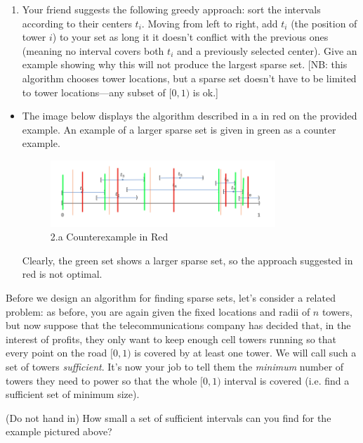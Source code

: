 \documentclass[letterpaper,11pt]{article}
\begin{document}
\begin{enumerate}
\begin{enumerate}
    \item Your friend suggests the following greedy approach: sort the intervals according to their centers $t_i$. Moving from left to right, add $t_i$ (the position of tower $i$) to your set as long it it doesn't conflict with the previous ones (meaning no interval covers both $t_i$ and a previously selected center). Give an example showing why this will not produce the largest sparse set. [NB: this algorithm chooses tower locations, but a sparse set doesn't have to be limited to tower locations—any subset of $[0,1)$ is ok.]
\end{enumerate}

\begin{itemize}
    \color{teal}
    \item The image below displays the algorithm described in a in red on the 
        provided example. An example of a larger sparse set is given in green 
        as a counter example.
        \begin{figure}[htpb]
            \centering
            \includegraphics[width=0.8\textwidth]{2a}
            \caption{2.a Counterexample in Red}
            \label{fig:2a}
        \end{figure}

        Clearly, the green set shows a larger sparse set, so the approach
        suggested in red is not optimal.
\end{itemize}


Before we design an algorithm for finding sparse sets, let's consider a related problem: as before, you are again given the fixed locations and radii of $n$ towers, but now suppose that the telecommunications company has decided that, in the interest of profits, they only want to keep enough cell towers running so that every point on the road $[0, 1)$ is covered by at least one tower. We will call such a set of towers \textit{sufficient}. It's now your job to tell them the \emph{minimum} number of towers they need to power so that the whole $[0,1)$ interval is covered (i.e. find a sufficient set of minimum size).

(Do not hand in) How small a set of sufficient intervals can you find for the example pictured above?



\end{enumerate}
\end{document}
